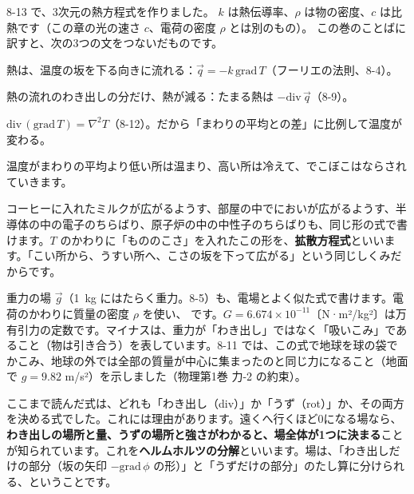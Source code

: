 

\label{bk:8-14:netsu}8-13 で、3次元の熱方程式を作りました。
$k$ は熱伝導率、$\rho$ は物の密度、$c$ は比熱です（この章の光の速さ $c$、電荷の密度 $\rho$ とは別のもの）。
この巻のことばに訳すと、次の3つの文をつないだものです。
\begin{enumerate}[label={\bkcircled[\bkTT]{\arabic*}}, leftmargin=2.4\zw, itemsep=2pt, topsep=2pt]
\item 熱は、温度の坂を下る向きに流れる：$\vec q=-k\,\mathrm{grad}\,T$（フーリエの法則、8-4）。
\item 熱の流れのわき出しの分だけ、熱が減る：たまる熱は $-\mathrm{div}\,\vec q$（8-9）。
\item $\mathrm{div}\,(\mathrm{grad}\,T)=\nabla^2T$（8-12）。だから「まわりの平均との差」に比例して温度が変わる。
\end{enumerate}
温度がまわりの平均より低い所は温まり、高い所は冷えて、でこぼこはならされていきます。

コーヒーに入れたミルクが広がるようす、部屋の中でにおいが広がるようす、半導体の中の電子のちらばり、原子炉の中の中性子のちらばりも、同じ形の式で書けます。$T$ のかわりに「もののこさ」を入れたこの形を、\textbf{拡散方程式}といいます。「こい所から、うすい所へ、こさの坂を下って広がる」という同じしくみだからです。


\label{bk:8-14:juryoku}重力の場 $\vec g$（\qty{1}{kg} にはたらく重力。8-5）も、電場とよく似た式で書けます。電荷のかわりに質量の密度 $\rho$ を使い、
です。$G=6.674\times10^{-11}$〔N·m²/kg²〕は万有引力の定数です。マイナスは、重力が「わき出し」ではなく「吸いこみ」であること（物は引き合う）を表しています。8-11 では、この式で地球を球の袋でかこみ、地球の外では全部の質量が中心に集まったのと同じ力になること（地面で $g=9.82$ m/s²）を示しました（物理第1巻 力-2 の約束）。


\label{bk:8-14:helm}ここまで読んだ式は、どれも「わき出し（div）」か「うず（rot）」か、その両方を決める式でした。これには理由があります。遠くへ行くほど0になる場なら、\textbf{わき出しの場所と量、うずの場所と強さがわかると、場全体が1つに決まる}ことが知られています。これを\textbf{ヘルムホルツの分解}といいます。場は、「わき出しだけの部分（坂の矢印 $-\mathrm{grad}\,\phi$ の形）」と「うずだけの部分」のたし算に分けられる、ということです。

